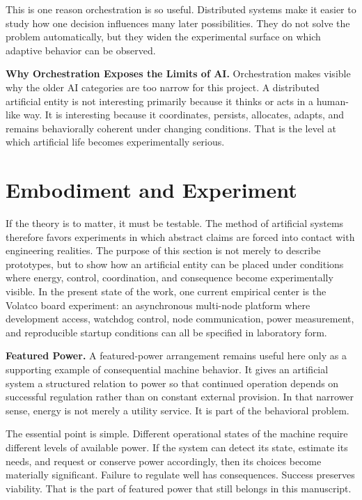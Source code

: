 \documentclass[a4paper,english]{article}
\begin{document}
This is one reason orchestration is so useful. Distributed systems
make it easier to study how one decision influences many later possibilities.
They do not solve the problem automatically, but they widen the experimental
surface on which adaptive behavior can be observed.

\textbf{Why Orchestration Exposes the Limits of AI.} Orchestration makes visible why the older AI categories are too narrow
for this project. A distributed artificial entity is not interesting
primarily because it thinks or acts in a human-like way. It is interesting
because it coordinates, persists, allocates, adapts, and remains
behaviorally coherent under changing conditions. That is the level
at which artificial life becomes experimentally serious.

\section{Embodiment and Experiment}

If the theory is to matter, it must be testable. The method of artificial
systems therefore favors experiments in which abstract claims are
forced into contact with engineering realities. The purpose of this
section is not merely to describe prototypes, but to show how an artificial
entity can be placed under conditions where energy, control, coordination,
and consequence become experimentally visible. In the present state
of the work, one current empirical center is the Volatco board experiment:
an asynchronous multi-node platform where development access, watchdog
control, node communication, power measurement, and reproducible startup
conditions can all be specified in laboratory form.


\textbf{Featured Power.} A featured-power arrangement remains useful here only as a
supporting example of consequential machine behavior. It gives an
artificial system a structured relation to power so that continued
operation depends on successful regulation rather than on constant
external provision. In that narrower sense, energy is not merely a
utility service. It is part of the behavioral problem.

The essential point is simple. Different operational states of the
machine require different levels of available power. If the system
can detect its state, estimate its needs, and request or conserve
power accordingly, then its choices become materially significant.
Failure to regulate well has consequences. Success preserves viability.
That is the part of featured power that still belongs in this manuscript.
\end{document}
